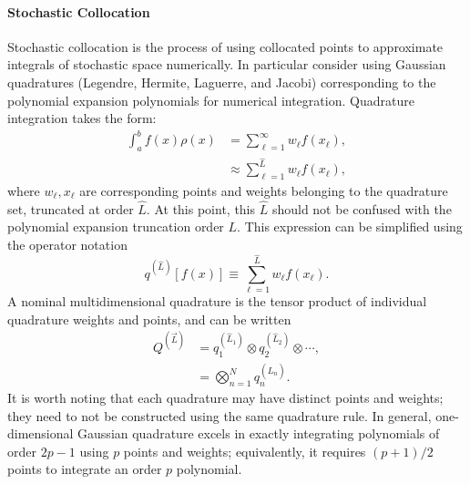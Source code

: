 \paragraph{Stochastic Collocation}\label{sec:stoch coll}
Stochastic collocation is the process of using collocated points to approximate integrals of stochastic space
numerically.  In particular consider using Gaussian quadratures (Legendre, Hermite, Laguerre, and Jacobi)
corresponding to the polynomial expansion polynomials for numerical integration.  Quadrature integration takes
the form:
\begin{align}
  \int_a^b f(x)\rho(x) &= \sum_{\ell=1}^\infty w_\ell f(x_\ell),\\
  &\approx \sum_{\ell=1}^{\hat L} w_\ell f(x_\ell),
\end{align}
where $w_\ell,x_\ell$ are corresponding points and weights belonging to the quadrature set, truncated at order
$\hat L$.  At this point, this $\hat L$ should not be confused with the polynomial expansion truncation order $L$.  This expression can be simplified using the operator notation
\begin{equation}\label{eq:quad op}
  q^{(\hat L)}[f(x)] \equiv \sum_{\ell=1}^{\hat L} w_\ell f(x_\ell).
\end{equation}
A nominal multidimensional quadrature is the tensor product of
individual quadrature weights and points, and can be written
\begin{align}
  Q^{(\vec{L})} &= q^{(\hat L_1)}_1 \otimes q^{(\hat L_2)}_2 \otimes \cdots,\\
                     &= \bigotimes_{n=1}^N q^{(\hat L_n)}_n.
\end{align}
It is worth noting that each quadrature may have distinct points and weights; they need to not be constructed using
the same quadrature rule.
In general, one-dimensional Gaussian
quadrature excels in exactly integrating polynomials of order $2p-1$ using $p$ points and weights;
equivalently, it requires $(p+1)/2$ points to integrate an order $p$ polynomial. 
 
